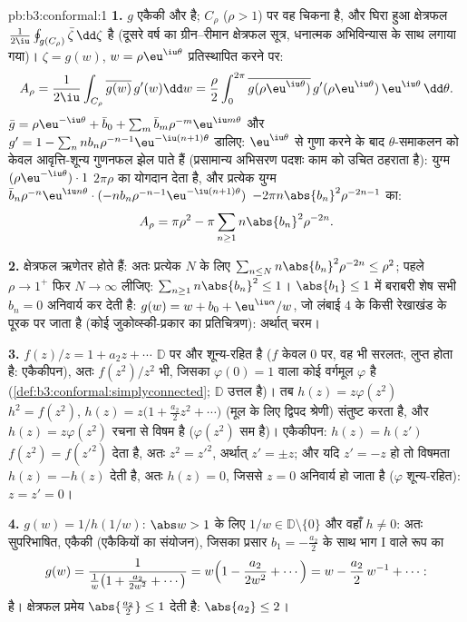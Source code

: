 \begin{solution}{pb:b3:conformal:1}
\textbf{1.} $g$ एकैकी और  है; $C_\rho$ ($\rho > 1$) पर वह चिकना
है, और घिरा हुआ क्षेत्रफल $\frac1{2\iu}\oint_{g(C_\rho)}\bar\zeta\,\dd\zeta$ है (दूसरे वर्ष का ग्रीन--रीमान
क्षेत्रफल सूत्र, धनात्मक अभिविन्यास के साथ लगाया गया)। $\zeta = g(w)$, $w =
\rho\eu^{\iu\theta}$
प्रतिस्थापित करने पर:
\[
A_\rho = \frac1{2\iu}\int_{C_\rho}\overline{g(w)}\,g'(w)\dd
w = \frac\rho2\int_0^{2\pi}\overline{g(\rho\eu^{\iu\theta})}
\,g'(\rho\eu^{\iu\theta})\,\eu^{\iu\theta}\,\dd\theta .
\]
$\bar g = \rho\eu^{-\iu\theta} + \bar b_0 +
\sum_m\bar b_m\rho^{-m}\eu^{\iu m\theta}$ और $g' = 1 -
\sum_nnb_n\rho^{-n-1}\eu^{-\iu(n+1)\theta}$ डालिए: $\eu^{\iu\theta}$ से गुणा करने के बाद $\theta$-समाकलन को केवल
आवृत्ति-शून्य गुणनफल झेल पाते हैं (प्रसामान्य अभिसरण पदशः काम को उचित
ठहराता है): युग्म $(\rho\eu^{-\iu\theta})\cdot1$ $2\pi\rho$ का योगदान देता है, और प्रत्येक युग्म
$\bar b_n\rho^{-n}\eu^{\iu
n\theta}\cdot(-nb_n\rho^{-n-1}\eu^{-\iu(n+1)\theta})$ $-2\pi n\abs{b_n}^2\rho^{-2n-1}$ का:
\[
A_\rho = \pi\rho^2 - \pi\sum_{n\geq1}n\abs{b_n}^2\rho^{-2n}.
\]

\textbf{2.} क्षेत्रफल ऋणेतर होते हैं: अतः प्रत्येक $N$ के लिए
$\sum_{n\leq
N}n\abs{b_n}^2\rho^{-2n} \leq \rho^2$; पहले $\rho \to 1^+$ फिर $N \to \infty$ लीजिए: $\sum_{n\geq1}n\abs{b_n}^2 \leq 1$। $\abs{b_1}
\leq 1$ में बराबरी शेष सभी
$b_n = 0$ अनिवार्य कर देती है: $g(w) = w + b_0 +
\eu^{\iu\alpha}/w$, जो लंबाई $4$ के किसी रेखाखंड के
पूरक पर जाता है (कोई जुकोव्स्की-प्रकार का प्रतिचित्रण): अर्थात् चरम।

\textbf{3.} $f(z)/z = 1 + a_2z + \cdots$ $\mathbb D$ पर  और शून्य-रहित है ($f$ केवल
$0$ पर, वह भी सरलतः, लुप्त होता है: एकैकीपन), अतः $f(z^2)/z^2$ भी, जिसका
$\varphi(0) = 1$ वाला कोई  वर्गमूल $\varphi$ है (\cref{def:b3:conformal:simplyconnected}; $\mathbb D$ उत्तल है)।
तब $h(z) = z\varphi(z^2)$ $h^2 =
f(z^2)$, $h(z) = z\bigl(1 + \frac{a_2}2z^2 + \cdots\bigr)$ (मूल के लिए द्विपद श्रेणी) संतुष्ट करता है,
और $h(z) = z\varphi(z^2)$ रचना से विषम है ($\varphi(z^2)$ सम है)। एकैकीपन: $h(z) = h(z')$ $f(z^2) =
f(z'^2)$ देता
है, अतः $z^2 = z'^2$, अर्थात् $z' = \pm z$; और यदि $z' = -z$ हो तो विषमता $h(z) = -h(z)$ देती
है, अतः $h(z) = 0$, जिससे $z
= 0$ अनिवार्य हो जाता है ($\varphi$ शून्य-रहित):
$z = z' = 0$।

\textbf{4.} $g(w) = 1/h(1/w)$: $\abs w > 1$ के लिए $1/w \in
\mathbb D\setminus\{0\}$ और वहाँ $h \neq 0$: अतः सुपरिभाषित,
एकैकी (एकैकियों का संयोजन), जिसका प्रसार $b_1 = -\frac{a_2}2$ के साथ भाग I वाले
रूप का
\[
g(w) = \frac{1}{\frac1w\bigl(1 + \frac{a_2}{2w^2} +
\cdots\bigr)} = w\Bigl(1 - \frac{a_2}{2w^2} + \cdots\Bigr)
= w - \frac{a_2}{2}\,w^{-1} + \cdots :
\]
है। क्षेत्रफल प्रमेय $\abs{\frac{a_2}2} \leq 1$ देती है: $\abs{a_2} \leq 2$।


\end{solution}
